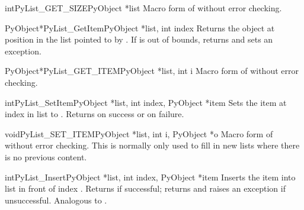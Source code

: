 \begin{cfuncdesc}{int}{PyList_GET_SIZE}{PyObject *list}
  Macro form of  without error checking.
\end{cfuncdesc}

\begin{cfuncdesc}{PyObject*}{PyList_GetItem}{PyObject *list, int index}
  Returns the object at position  in the list pointed to by
  .  If  is out of bounds, returns \NULL{} and sets an
   exception.
\end{cfuncdesc}

\begin{cfuncdesc}{PyObject*}{PyList_GET_ITEM}{PyObject *list, int i}
  Macro form of  without error checking.
\end{cfuncdesc}

\begin{cfuncdesc}{int}{PyList_SetItem}{PyObject *list, int index,
                                       PyObject *item}
  Sets the item at index  in list to .  Returns
   on success or  on failure.  
\end{cfuncdesc}

\begin{cfuncdesc}{void}{PyList_SET_ITEM}{PyObject *list, int i,
                                              PyObject *o}
  Macro form of  without error checking.
  This is normally only used to fill in new lists where there is no
  previous content.
\end{cfuncdesc}

\begin{cfuncdesc}{int}{PyList_Insert}{PyObject *list, int index,
                                      PyObject *item}
  Inserts the item  into list  in front of index
  .  Returns  if successful; returns  and
  raises an exception if unsuccessful.  Analogous to
  .
\end{cfuncdesc}

